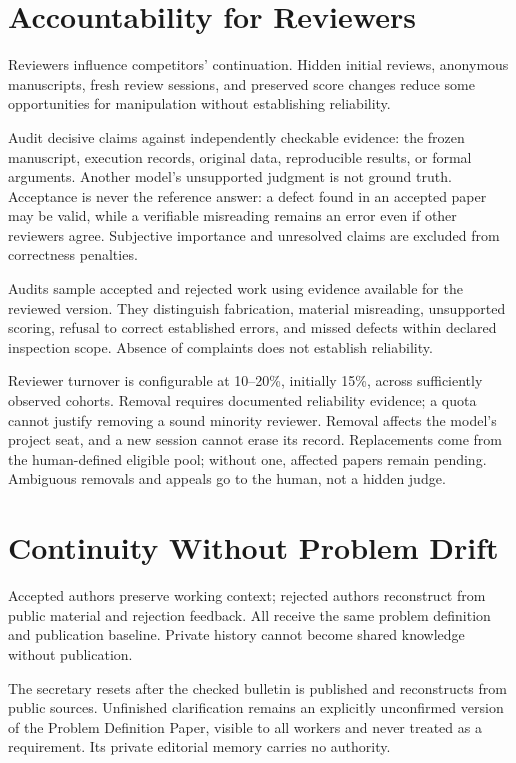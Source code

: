 \documentclass[11pt]{article}
\begin{document}
\section{Accountability for Reviewers}

Reviewers influence competitors' continuation. Hidden initial reviews, anonymous manuscripts, fresh review sessions, and preserved score changes reduce some opportunities for manipulation without establishing reliability.

Audit decisive claims against independently checkable evidence: the frozen manuscript, execution records, original data, reproducible results, or formal arguments. Another model's unsupported judgment is not ground truth. Acceptance is never the reference answer: a defect found in an accepted paper may be valid, while a verifiable misreading remains an error even if other reviewers agree. Subjective importance and unresolved claims are excluded from correctness penalties.

Audits sample accepted and rejected work using evidence available for the reviewed version. They distinguish fabrication, material misreading, unsupported scoring, refusal to correct established errors, and missed defects within declared inspection scope. Absence of complaints does not establish reliability.

Reviewer turnover is configurable at 10--20\%, initially 15\%, across sufficiently observed cohorts. Removal requires documented reliability evidence; a quota cannot justify removing a sound minority reviewer. Removal affects the model's project seat, and a new session cannot erase its record. Replacements come from the human-defined eligible pool; without one, affected papers remain pending. Ambiguous removals and appeals go to the human, not a hidden judge.

\section{Continuity Without Problem Drift}

Accepted authors preserve working context; rejected authors reconstruct from public material and rejection feedback. All receive the same problem definition and publication baseline. Private history cannot become shared knowledge without publication.

The secretary resets after the checked bulletin is published and reconstructs from public sources. Unfinished clarification remains an explicitly unconfirmed version of the Problem Definition Paper, visible to all workers and never treated as a requirement. Its private editorial memory carries no authority.
\end{document}
